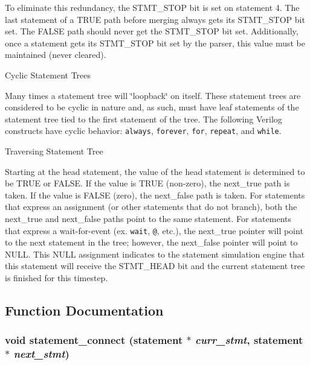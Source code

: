  To eliminate this redundancy, the STMT\_\-STOP bit is set on statement 4. The last statement of a TRUE path before merging always gets its STMT\_\-STOP bit set. The FALSE path should never get the STMT\_\-STOP bit set. Additionally, once a statement gets its STMT\_\-STOP bit set by the parser, this value must be maintained (never cleared).\begin{Desc}
\item[Cyclic Statement Trees]\par
 Many times a statement tree will \char`\"{}loopback\char`\"{} on itself. These statement trees are considered to be cyclic in nature and, as such, must have leaf statements of the statement tree tied to the first statement of the tree. The following Verilog constructs have cyclic behavior: {\tt always}, {\tt forever}, {\tt for}, {\tt repeat}, and {\tt while}.\end{Desc}
\begin{Desc}
\item[Traversing Statement Tree]\par
 Starting at the head statement, the value of the head statement is determined to be TRUE or FALSE. If the value is TRUE (non-zero), the next\_\-true path is taken. If the value is FALSE (zero), the next\_\-false path is taken. For statements that express an assignment (or other statements that do not branch), both the next\_\-true and next\_\-false paths point to the same statement. For statements that express a wait-for-event (ex. {\tt wait}, {\tt @}, etc.), the next\_\-true pointer will point to the next statement in the tree; however, the next\_\-false pointer will point to NULL. This NULL assignment indicates to the statement simulation engine that this statement will receive the STMT\_\-HEAD bit and the current statement tree is finished for this timestep.\end{Desc}


\subsection{Function Documentation}
\subsubsection{\setlength{\rightskip}{0pt plus 5cm}void statement\_\-connect ({\bf statement} $\ast$ {\em curr\_\-stmt}, {\bf statement} $\ast$ {\em next\_\-stmt})}\label{statement_8c_a3}


